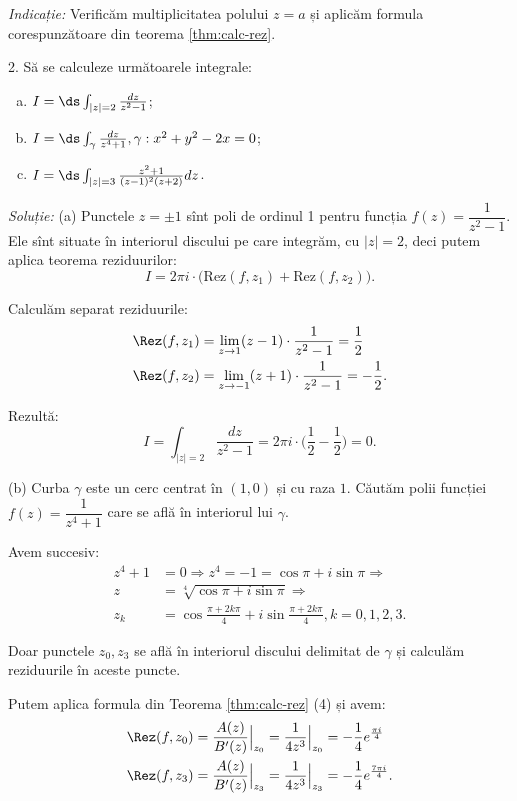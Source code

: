 \emph{Indicație:} Verificăm multiplicitatea polului $ z = a $ și aplicăm formula
corespunzătoare din teorema \ref{thm:calc-rez}.

\vspace{1cm}

2. Să se calculeze următoarele integrale:
\begin{enumerate}[(a)]
\item $ I = \ds\int_{|z| = 2} \frac{dz}{z^2 - 1} $;
\item $ I = \ds\int_\gamma \frac{dz}{z^4 + 1}, \gamma: x^2 + y^2 - 2x = 0 $;
\item $ I = \ds\int_{|z| = 3} \frac{z^2 + 1}{(z - 1)^2 (z + 2)} dz $.
\end{enumerate}

\emph{Soluție:} (a) Punctele $ z = \pm 1 $ sînt poli de ordinul 1 pentru
funcția $ f(z) = \dfrac{1}{z^2 - 1} $. Ele sînt situate în interiorul discului pe
care integrăm, cu $ |z| = 2 $, deci putem aplica teorema reziduurilor:
\[
  I = 2 \pi i \cdot \Big( \mathrm{Rez}(f, z_1) + \mathrm{Rez}(f, z_2) \Big).
\]

Calculăm separat reziduurile:
\begin{align*}
  \Rez(f, z_1) &= \lim_{z \to 1} (z - 1) \cdot \frac{1}{z^2 - 1} = \frac{1}{2} \\
  \Rez(f, z_2) &= \lim_{z \to -1} (z + 1) \cdot \frac{1}{z^2 - 1} = -\frac{1}{2}.
\end{align*}

Rezultă:
\[
  I = \int_{|z| = 2} \frac{dz}{z^2 - 1} = 2 \pi i \cdot \Big( \frac{1}{2} - \frac{1}{2} \Big) = 0.
\]

\vspace{1cm}

(b) Curba $ \gamma $ este un cerc centrat în $ (1, 0) $ și cu raza $ 1 $. Căutăm
polii funcției $ f(z) = \dfrac{1}{z^4 + 1} $ care se află în interiorul lui $ \gamma $.

Avem succesiv:
\begin{align*}
  z^4 + 1 &= 0 \Rightarrow z^4 = -1 = \cos \pi + i \sin \pi \Rightarrow \\
  z &= \sqrt[4]{\cos \pi + i \sin \pi} \Rightarrow \\
  z_k &= \cos \frac{\pi + 2k\pi}{4} + i \sin \frac{\pi + 2k\pi}{4}, k = 0, 1, 2, 3.
\end{align*}

Doar punctele $ z_0, z_3 $ se află în interiorul discului delimitat de $ \gamma $
și calculăm reziduurile în aceste puncte.

Putem aplica formula din Teorema \ref{thm:calc-rez} (4) și avem:
\begin{align*}
  \Rez(f, z_0) &= \frac{A(z)}{B'(z)}\Big|_{z_0} = \frac{1}{4z^3}\Big|_{z_0} %
                 = -\frac{1}{4} e^{\frac{\pi i}{4}} \\
  \Rez(f, z_3) &= \frac{A(z)}{B'(z)}\Big|_{z_3} = \frac{1}{4z^3}\Big|_{z_3} %
                 = - \frac{1}{4} e^{\frac{7 \pi i}{4}}.
\end{align*}

